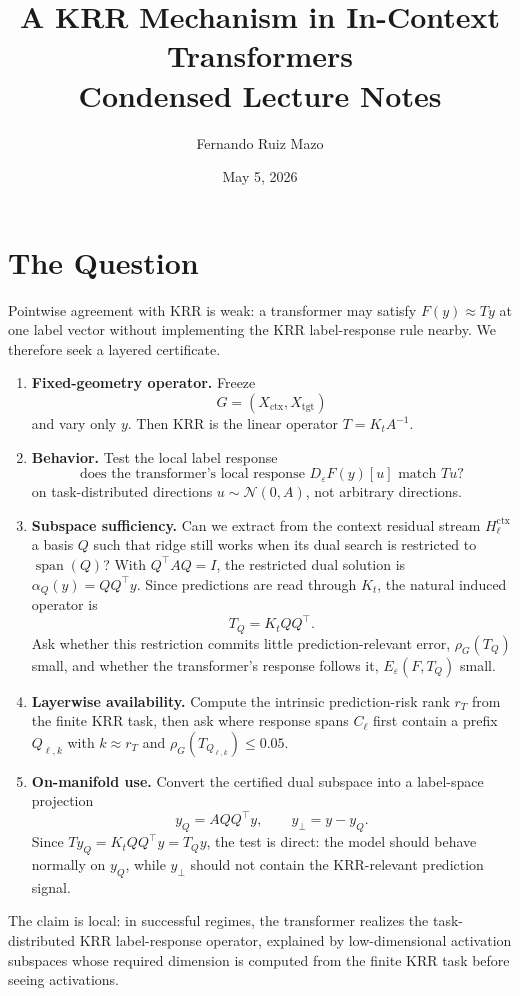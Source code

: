 \documentclass[11pt]{article}
\title{A KRR Mechanism in In-Context Transformers\\
\large Condensed Lecture Notes}
\author{Fernando Ruiz Mazo}
\date{May 5, 2026}
\newcommand{\spanop}{\operatorname{span}}
\begin{document}
\maketitle

\section{The Question}

Pointwise agreement with KRR is weak: a transformer may satisfy \(F(y)\approx Ty\) at one label
vector without implementing the KRR label-response rule nearby. We therefore seek a layered
certificate.

\begin{enumerate}[label=\arabic*.]
\item \textbf{Fixed-geometry operator.} Freeze
\[
G=(X_{\mathrm{ctx}},X_{\mathrm{tgt}})
\]
and vary only \(y\). Then KRR is the linear operator \(T=K_tA^{-1}\).
\item \textbf{Behavior.} Test the local label response
\[
\text{does the transformer's local response }D_\varepsilon F(y)[u]\text{ match }Tu?
\]
on task-distributed directions \(u\sim\mathcal{N}(0,A)\), not arbitrary directions.
\item \textbf{Subspace sufficiency.} Can we extract from the context residual stream
\(H_\ell^{\mathrm{ctx}}\) a basis \(Q\) such that ridge still works when its dual search is
restricted to \(\spanop(Q)\)? With \(Q^\top A Q=I\), the restricted dual solution is
\(\alpha_Q(y)=QQ^\top y\). Since predictions are read through \(K_t\), the natural induced
operator is
\[
T_Q=K_tQQ^\top.
\]
Ask whether this restriction commits little prediction-relevant error, \(\rho_G(T_Q)\) small, and
whether the transformer's response follows it, \(E_\varepsilon(F,T_Q)\) small.
\item \textbf{Layerwise availability.} Compute the intrinsic prediction-risk rank \(r_T\) from the
finite KRR task, then ask where response spans \(C_\ell\) first contain a prefix
\(Q_{\ell,k}\) with \(k\approx r_T\) and \(\rho_G(T_{Q_{\ell,k}})\le0.05\).
\item \textbf{On-manifold use.} Convert the certified dual subspace into a label-space projection
\[
y_Q=AQQ^\top y,\qquad y_\perp=y-y_Q.
\]
Since \(Ty_Q=K_tQQ^\top y=T_Qy\), the test is direct: the model should behave normally on
\(y_Q\), while \(y_\perp\) should not contain the KRR-relevant prediction signal.
\end{enumerate}

The claim is local: in successful regimes, the transformer realizes the task-distributed KRR
label-response operator, explained by low-dimensional activation subspaces whose required dimension
is computed from the finite KRR task before seeing activations.
\end{document}
